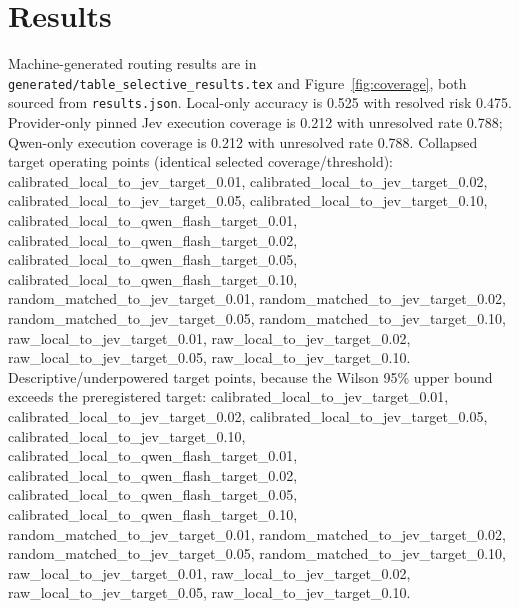 \documentclass[11pt]{article}
\begin{document}
\section{Results}
Machine-generated routing results are in \texttt{generated/table\_selective\_results.tex} and Figure~\ref{fig:coverage}, both sourced from \texttt{results.json}. Local-only accuracy is 0.525 with resolved risk 0.475. Provider-only pinned Jev execution coverage is 0.212 with unresolved rate 0.788; Qwen-only execution coverage is 0.212 with unresolved rate 0.788. Collapsed target operating points (identical selected coverage/threshold): calibrated\_local\_to\_jev\_target\_0.01, calibrated\_local\_to\_jev\_target\_0.02, calibrated\_local\_to\_jev\_target\_0.05, calibrated\_local\_to\_jev\_target\_0.10, calibrated\_local\_to\_qwen\_flash\_target\_0.01, calibrated\_local\_to\_qwen\_flash\_target\_0.02, calibrated\_local\_to\_qwen\_flash\_target\_0.05, calibrated\_local\_to\_qwen\_flash\_target\_0.10, random\_matched\_to\_jev\_target\_0.01, random\_matched\_to\_jev\_target\_0.02, random\_matched\_to\_jev\_target\_0.05, random\_matched\_to\_jev\_target\_0.10, raw\_local\_to\_jev\_target\_0.01, raw\_local\_to\_jev\_target\_0.02, raw\_local\_to\_jev\_target\_0.05, raw\_local\_to\_jev\_target\_0.10. Descriptive/underpowered target points, because the Wilson 95\% upper bound exceeds the preregistered target: calibrated\_local\_to\_jev\_target\_0.01, calibrated\_local\_to\_jev\_target\_0.02, calibrated\_local\_to\_jev\_target\_0.05, calibrated\_local\_to\_jev\_target\_0.10, calibrated\_local\_to\_qwen\_flash\_target\_0.01, calibrated\_local\_to\_qwen\_flash\_target\_0.02, calibrated\_local\_to\_qwen\_flash\_target\_0.05, calibrated\_local\_to\_qwen\_flash\_target\_0.10, random\_matched\_to\_jev\_target\_0.01, random\_matched\_to\_jev\_target\_0.02, random\_matched\_to\_jev\_target\_0.05, random\_matched\_to\_jev\_target\_0.10, raw\_local\_to\_jev\_target\_0.01, raw\_local\_to\_jev\_target\_0.02, raw\_local\_to\_jev\_target\_0.05, raw\_local\_to\_jev\_target\_0.10.
\begin{table}[h]
\centering
\resizebox{\textwidth}{!}{}
\caption{Machine-generated policy metrics from \texttt{EXP-20260920-012-selective-escalation-qwen-streaming/results.json}. Resolved risk excludes unresolved provider calls.}
\end{table}
\begin{table}[h]
\centering

\caption{Execution coverage by policy, generated from the same results artifact.}
\label{fig:coverage}
\end{table}
\end{document}
